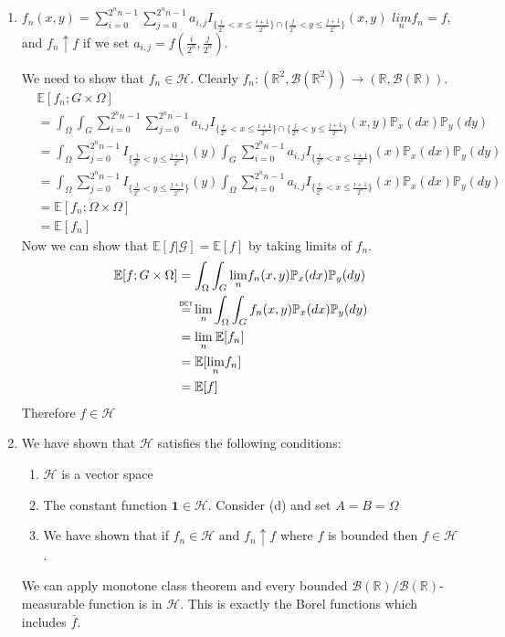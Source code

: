 \documentclass[12pt, letterpaper]{article}
\newcommand\myeq{\mathrel{\overset{\makebox[0pt]{\mbox{\normalfont\tiny\sffamily DCT}}}{=}}}
\begin{document}
\begin{enumerate} [label = \textbf{\alph*)}]
	\newpage
	\item  $f_n(x, y) = \sum_{i = 0}^{2^nn - 1}\sum_{j = 0}^{2^nn-1} a_{i, j} I_{\{\frac{i}{2^n} < x \leq \frac{i + 1}{2^n}\}\cap \{\frac{j}{2^n} < y \leq \frac{j+1}{2^n}\}}(x, y)$ \newline
	$\underset{n}{lim}f_n = f$, and $f_n \uparrow f$ if we set $a_{i,j} = f(\frac{i}{2^n}, \frac{j}{2^n})$.
	
	We need to show that $f_n \in \mathcal{H}$. Clearly $f_n: (\mathbb{R}^2, \mathcal{B}(\mathbb{R}^2)) \rightarrow (\mathbb{R}, \mathcal{B}(\mathbb{R}))$.
	\begin{align*}
		& \mathbb{E}[f_n; G\times \Omega] \\
		& = \int_\Omega\int_G \sum_{i = 0}^{2^nn - 1}\sum_{j = 0}^{2^nn-1} a_{i, j} I_{\{\frac{i}{2^n} < x \leq \frac{i + 1}{2^n}\}\cap \{\frac{j}{2^n} < y \leq \frac{j+1}{2^n}\}}(x, y) \mathbb{P}_x (dx) \mathbb{P}_y (dy) \\
		& = \int_\Omega \sum_{j = 0}^{2^nn-1} I_{\{\frac{j}{2^n} < y \leq \frac{j+1}{2^n}\}} (y)\int_G \sum_{i = 0}^{2^nn - 1} a_{i, j} I_{\{\frac{i}{2^n} < x \leq \frac{i + 1}{2^n}\}}(x) \mathbb{P}_x (dx) \mathbb{P}_y (dy) \\
		& = \int_\Omega \sum_{j = 0}^{2^nn-1} I_{\{\frac{j}{2^n} < y \leq \frac{j+1}{2^n}\}} (y)\int_\Omega \sum_{i = 0}^{2^nn - 1} a_{i, j} I_{\{\frac{i}{2^n} < x \leq \frac{i + 1}{2^n}\}}(x) \mathbb{P}_x (dx) \mathbb{P}_y (dy) \tag{$x \in G$}\\
		& = \mathbb{E}[f_n;\Omega \times \Omega] \\
		& = \mathbb{E}[f_n]
	\end{align*}
	Now we can show that $\mathbb{E}[f|\mathcal{G}] = \mathbb{E}[f]$ by taking limits of $f_n$.	
	\begin{align*}
		\mathbb{E}[f;G \times \Omega] & = \int_\Omega	\int_G \underset{n}{\lim}f_n (x, y) \mathbb{P}_x (dx) \mathbb{P}_y (dy) \\
		& \myeq \underset{n}{\lim} \int_\Omega \int_G f_n (x, y) \mathbb{P}_x (dx) \mathbb{P}_y (dy) \\
		& =  \underset{n}{\lim} \: \mathbb{E}[f_n] \\
		& = \mathbb{E}[ \underset{n}{\lim} f_n] \\
		& = \mathbb{E}[f]
	\end{align*}
	Therefore $f \in \mathcal{H}$
	
	\item We have shown that $\mathcal{H}$ satisfies the following conditions: 
	\begin{enumerate} [label = \roman*)]
		\item $\mathcal{H}$ is a vector space
		\item The constant function $\textbf{1} \in \mathcal{H}$. Consider (d) and set $A = B = \Omega$
		\item We have shown that if $f_n \in \mathcal{H}$ and $f_n \uparrow f$ where $f$ is bounded then $f \in \mathcal{H}$.
		\end{enumerate}
		We can apply monotone class theorem and every bounded $\mathcal{B}(\mathbb{R})/\mathcal{B}(\mathbb{R})$-measurable function is in $\mathcal{H}$. This is exactly the Borel functions which includes $\bar{f}$.
	
\end{enumerate}		
\end{document}
